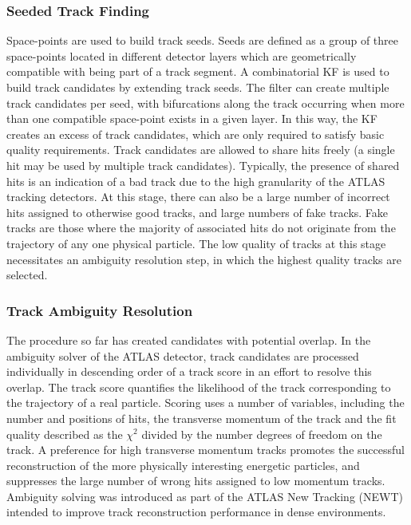 \subsubsection{Seeded Track Finding}
Space-points are used to build track seeds. Seeds are defined as a group of three space-points located in different detector layers which are geometrically compatible with being part of a track segment. A combinatorial KF is used to build track candidates by extending track seeds. The filter can create multiple track candidates per seed, with bifurcations along the track occurring when more than one compatible space-point exists in a given layer. In this way, the KF creates an excess of track candidates, which are only required to satisfy basic quality requirements. Track candidates are allowed to share hits freely (a single hit may be used by multiple track candidates). Typically, the presence of shared hits is an indication of a bad track due to the high granularity of the ATLAS tracking detectors. At this stage, there can also be a large number of incorrect hits assigned to otherwise good tracks, and large numbers of fake tracks. Fake tracks are those where the majority of associated hits do not originate from the trajectory of any one physical particle. The low quality of tracks at this stage necessitates an ambiguity resolution step, in which the highest quality tracks are selected.

\subsubsection{Track Ambiguity Resolution}

The procedure so far has created candidates with potential overlap. In the ambiguity solver of the ATLAS detector, track candidates are processed individually in descending order of a track score in an effort to resolve this overlap. The track score quantifies the likelihood of the track corresponding to the trajectory of a real particle. Scoring uses a number of variables, including the number and positions of hits, the transverse momentum of the track and the fit quality described as the $\chi^{2}$ divided by the number degrees of freedom on the track. A preference for high transverse momentum tracks promotes the successful reconstruction of the more physically interesting energetic particles, and suppresses the large number of wrong hits assigned to low momentum tracks. Ambiguity solving was introduced as part of the ATLAS New Tracking (NEWT) \cite{Cornelissen:2007vba} intended to improve track reconstruction performance in dense environments. 

